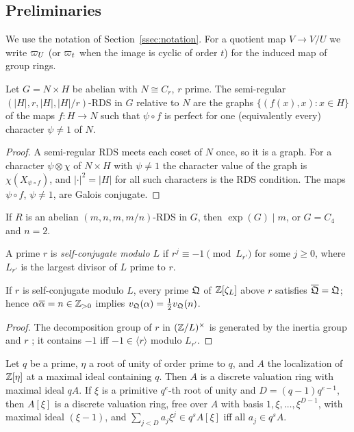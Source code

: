\subsection{Preliminaries}\label{ssec:prelimC}
We use the notation of Section~\ref{ssec:notation}. For a quotient map
$V\to V/U$ we write $\varpi_U$ (or $\varpi_t$ when the image is cyclic of order
$t$) for the induced map of group rings.

\begin{proposition}\label{prop:rds-split}
Let $G=N\times H$ be abelian with $N\cong C_r$, $r$ prime. The
semi-regular $(|H|,r,|H|,|H|/r)$-RDS in $G$ relative to $N$ are the graphs
$\{(f(x),x):x\in H\}$ of the maps $f:H\to N$ such that $\psi\circ f$ is
perfect for one (equivalently every) character $\psi\ne1$ of $N$.
\end{proposition}

\begin{proof}
A semi-regular RDS meets each coset of $N$ once, so it is a graph. For a
character $\psi\otimes\chi$ of $N\times H$ with $\psi\ne1$ the character
value of the graph is $\chi(X_{\psi\circ f})$, and $|\cdot|^2=|H|$ for all
such characters is the RDS condition. The maps $\psi\circ f$, $\psi\ne1$,
are Galois conjugate.
\end{proof}

\begin{proposition}\label{prop:exponent}
If $R$ is an abelian $(m,n,m,m/n)$-RDS in $G$, then $\exp(G)\mid m$, or
$G=C_4$ and $n=2$.
\end{proposition}

A prime $r$ is \emph{self-conjugate modulo $L$} if $r^j\equiv-1\pmod
{L_{r'}}$ for some $j\ge0$, where $L_{r'}$ is the largest divisor of $L$
prime to $r$.

\begin{lemma}\label{lem:selfconj}
If $r$ is self-conjugate modulo $L$, every prime $\mathfrak{Q}$ of $\mathbb{Z}[\zeta_L]$
above $r$ satisfies $\overline{\mathfrak{Q}}=\mathfrak{Q}$; hence $\alpha\overline{\alpha}=n\in\mathbb{Z}_{>0}$
implies $v_{\mathfrak{Q}}(\alpha)=\frac12v_{\mathfrak{Q}}(n)$.
\end{lemma}

\begin{proof}
The decomposition group of $r$ in $(\mathbb{Z}/L)^\times$ is generated by the
inertia group and $r$ \cite[Thm.~2.13]{Washington1997}; it contains $-1$
iff $-1\in\langle r\rangle$ modulo $L_{r'}$.
\end{proof}

\begin{lemma}\label{lem:local}
Let $q$ be a prime, $\eta$ a root of unity of order prime to $q$, and $A$
the localization of $\mathbb{Z}[\eta]$ at a maximal ideal containing $q$. Then
$A$ is a discrete valuation ring with maximal ideal $qA$. If $\xi$ is a
primitive $q^e$-th root of unity and $D=(q-1)q^{e-1}$, then $A[\xi]$ is a
discrete valuation ring, free over $A$ with basis $1,\xi,\dots,\xi^{D-1}$,
with maximal ideal $(\xi-1)$, and $\sum_{j<D}a_j\xi^j\in q^sA[\xi]$ iff
all $a_j\in q^sA$.
\end{lemma}

